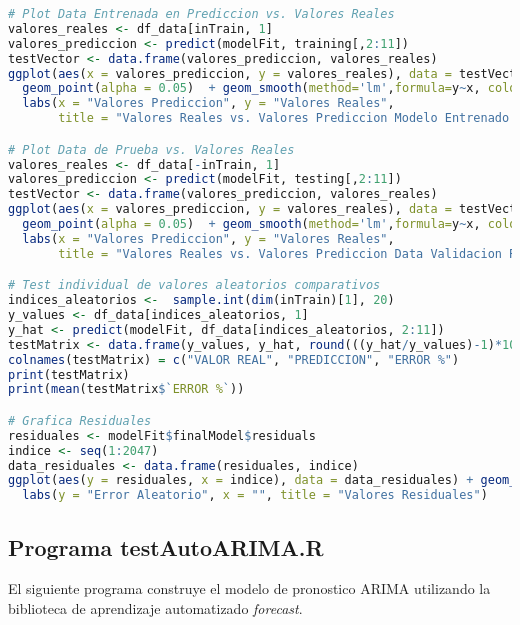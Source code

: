 \begin{lstlisting}[language=R]
# Plot Data Entrenada en Prediccion vs. Valores Reales
valores_reales <- df_data[inTrain, 1]
valores_prediccion <- predict(modelFit, training[,2:11])
testVector <- data.frame(valores_prediccion, valores_reales)
ggplot(aes(x = valores_prediccion, y = valores_reales), data = testVector) +
  geom_point(alpha = 0.05)  + geom_smooth(method='lm',formula=y~x, colour = "green") +
  labs(x = "Valores Prediccion", y = "Valores Reales",
       title = "Valores Reales vs. Valores Prediccion Modelo Entrenado Regresion Multivariable")

# Plot Data de Prueba vs. Valores Reales
valores_reales <- df_data[-inTrain, 1]
valores_prediccion <- predict(modelFit, testing[,2:11])
testVector <- data.frame(valores_prediccion, valores_reales)
ggplot(aes(x = valores_prediccion, y = valores_reales), data = testVector) +
  geom_point(alpha = 0.05)  + geom_smooth(method='lm',formula=y~x, colour = "yellow") +
  labs(x = "Valores Prediccion", y = "Valores Reales",
       title = "Valores Reales vs. Valores Prediccion Data Validacion Regresion Multivariable")

# Test individual de valores aleatorios comparativos
indices_aleatorios <-  sample.int(dim(inTrain)[1], 20)
y_values <- df_data[indices_aleatorios, 1]
y_hat <- predict(modelFit, df_data[indices_aleatorios, 2:11])
testMatrix <- data.frame(y_values, y_hat, round(((y_hat/y_values)-1)*100,1))
colnames(testMatrix) = c("VALOR REAL", "PREDICCION", "ERROR %")
print(testMatrix)
print(mean(testMatrix$`ERROR %`))

# Grafica Residuales
residuales <- modelFit$finalModel$residuals
indice <- seq(1:2047)
data_residuales <- data.frame(residuales, indice)
ggplot(aes(y = residuales, x = indice), data = data_residuales) + geom_jitter(alpha = 1/05) +
  labs(y = "Error Aleatorio", x = "", title = "Valores Residuales")
\end{lstlisting}

\subsection{Programa testAutoARIMA.R}
El siguiente programa construye el modelo de pronostico ARIMA utilizando la biblioteca de aprendizaje automatizado \emph{forecast}.

